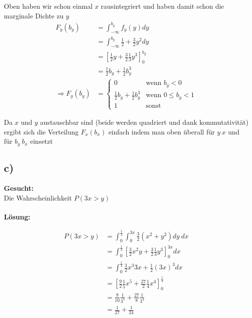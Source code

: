 \documentclass{article}
\begin{document}
Oben haben wir schon einmal $x$ rausintegriert und haben damit schon die marginale Dichte zu $y$ 
\begin{align*}
    F_y(b_y) &= \int_{-\infty}^{b_y} f_y(y) dy \\
    &= \int_{-\infty}^{b_y} \frac{1}{2} + \frac{3}{2} y^2 dy \\
    &= \left[\frac{1}{2}y + \frac{3}{2} \frac{1}{3} y^3 \right]^{b_y}_0 \\
    &= \frac{1}{2}b_y + \frac{1}{2} b_y^3 \\
    \Longrightarrow F_y(b_y) &= \begin{cases}
    0 &\text{wenn } b_y < 0 \\
    \frac{1}{2}b_y + \frac{1}{2} b_y^3 &\text{wenn } 0 \leq b_y < 1 \\
    1 &\text{sonst}  
    \end{cases} 
\end{align*}

Da $x$ und $y$ austauschbar sind (beide werden quadriert und dank kommutativität) ergibt sich die Verteilung $F_x(b_x)$ einfach indem man oben überall für $y ~ x$ und für $b_y ~ b_x$ einsetzt 
\subsection*{c)}
\textbf{Gesucht:} \\

Die Wahrscheinlichkeit $P(3x>y)$\\ \\
\textbf{Lösung:}

\begin{align*}
    P(3x > y) &= \int_{0}^{\frac{1}{3}}\int_{0}^{3x}\frac{3}{2}(x^2 + y^2)dy ~dx \\
    &= \int_{0}^{\frac{1}{3}} \left[\frac{3}{2}x^2y + \frac{3}{2}\frac{1}{3}y^3\right]_0^{3x} dx \\
    &= \int_{0}^{\frac{1}{3}} \frac{3}{2}x^3 3x + \frac{1}{2}(3x)^3 dx \\
    &= \left[\frac{9}{2}\frac{1}{5}x^5 + \frac{27}{2}\frac{1}{4}x^4\right]^{\frac{1}{3}}_0 \\
    &= \frac{9}{10} \frac{1}{3^5} + \frac{27}{8}  \frac{1}{3^4} \\
    &= \frac{1}{27} + \frac{1}{24}
\end{align*}
\end{document}
